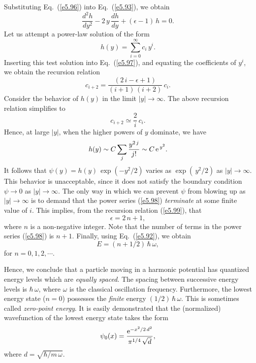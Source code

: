 Substituting Eq.~(\ref{e5.96}) into Eq.~(\ref{e5.93}), we obtain
\begin{equation}\label{e5.97}
\frac{d^2h}{dy^2} - 2\,y\,\frac{dh}{dy} + (\epsilon-1)\,h = 0.
\end{equation}
Let us attempt a power-law solution of the form
\begin{equation}\label{e5.98}
h(y) = \sum_{i=0}^\infty c_i\,y^i.
\end{equation}
Inserting this test solution into Eq.~(\ref{e5.97}), and equating the
coefficients of $y^i$, we obtain the recursion relation
\begin{equation}\label{e5.99}
c_{i+2} = \frac{(2\,i-\epsilon+1)}{(i+1)\,(i+2)}\,c_i.
\end{equation}
Consider the behavior of $h(y)$ in the limit $|y|\rightarrow\infty$.
The above recursion relation simplifies to
\begin{equation}
c_{i+2} \simeq \frac{2}{i}\,c_i.
\end{equation}
Hence, at large $|y|$, when the higher powers of $y$ dominate, we
have
\begin{equation}
h(y) \sim C \sum_{j}\frac{y^{2\,j}}{j!}\sim C\,{\rm e}^{\,y^2}.
\end{equation}
It follows that $\psi(y) = h(y)\,\exp(-y^2/2)$ varies as
$\exp(\,y^2/2)$ as $|y|\rightarrow\infty$.  This behavior is unacceptable,
since it does not satisfy the boundary condition $\psi\rightarrow 0$
as $|y|\rightarrow\infty$. The only way in which we can prevent $\psi$
from blowing up as $|y|\rightarrow\infty$
is to demand that the power series (\ref{e5.98}) {\em terminate}\/ at
some finite value of $i$. This implies, from the recursion relation
(\ref{e5.99}), that
\begin{equation}
\epsilon = 2\,n+1,
\end{equation}
where $n$ is a non-negative integer. Note that the number of terms in the power
series (\ref{e5.98}) is $n+1$. Finally, using Eq.~(\ref{e5.92}), we obtain
\begin{equation}
E = (n+1/2)\,\hbar\,\omega,
\end{equation}
for $n=0,1,2,\cdots$. 

Hence, we conclude that a particle moving in a
harmonic potential has quantized energy levels which
are {\em equally spaced}. The
spacing between successive energy levels is $\hbar\,\omega$, where
$\omega$ is the classical oscillation frequency. Furthermore, the
lowest energy state ($n=0$) possesses the {\em finite}\/ energy
$(1/2)\,\hbar\,\omega$. This is sometimes called {\em zero-point energy}.
It is easily demonstrated that the (normalized) wavefunction of the lowest
energy state takes the form
\begin{equation}
\psi_0(x) = \frac{{\rm e}^{-x^2/2\,d^2}}{\pi^{1/4}\,\sqrt{d}},
\end{equation}
where $d=\sqrt{\hbar/m\,\omega}$. 

